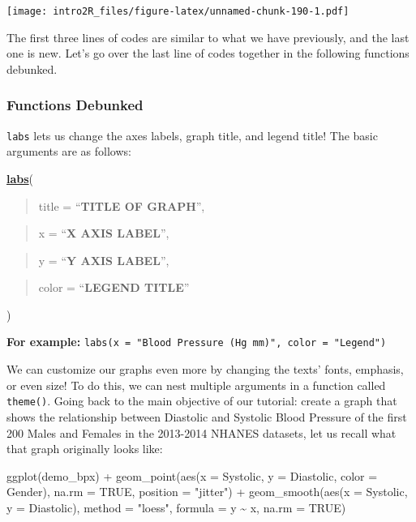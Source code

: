 \documentclass[
]{book}
\newenvironment{Shaded}{\begin{snugshade}}{\end{snugshade}}
\newcommand{\AttributeTok}[1]{\textcolor[rgb]{0.77,0.63,0.00}{#1}}
\newcommand{\ConstantTok}[1]{\textcolor[rgb]{0.00,0.00,0.00}{#1}}
\newcommand{\FunctionTok}[1]{\textcolor[rgb]{0.00,0.00,0.00}{#1}}
\newcommand{\NormalTok}[1]{#1}
\newcommand{\SpecialCharTok}[1]{\textcolor[rgb]{0.00,0.00,0.00}{#1}}
\newcommand{\StringTok}[1]{\textcolor[rgb]{0.31,0.60,0.02}{#1}}
\begin{document}
\texttt{[image: intro2R\_files/figure-latex/unnamed-chunk-190-1.pdf]}

The first three lines of codes are similar to what we have previously, and the last one is new. Let's go over the last line of codes together in the following functions debunked.

\hypertarget{functions-debunked-19}{%
\subsubsection{Functions Debunked}\label{functions-debunked-19}}

\texttt{labs} lets us change the axes labels, graph title, and legend title! The basic arguments are as follows:

\textbf{\href{https://ggplot2.tidyverse.org/reference/labs.html}{labs}}(

\begin{quote}
title = ``\textbf{TITLE OF GRAPH}'',
\end{quote}

\begin{quote}
x = ``\textbf{X AXIS LABEL}'',
\end{quote}

\begin{quote}
y = ``\textbf{Y AXIS LABEL}'',
\end{quote}

\begin{quote}
color = ``\textbf{LEGEND TITLE}''
\end{quote}

)

\textbf{For example:} \texttt{labs(x\ =\ "Blood\ Pressure\ (Hg\ mm)",\ color\ =\ "Legend")}

We can customize our graphs even more by changing the texts' fonts, emphasis, or even size! To do this, we can nest multiple arguments in a function called \texttt{theme()}. Going back to the main objective of our tutorial: create a graph that shows the relationship between Diastolic and Systolic Blood Pressure of the first 200 Males and Females in the 2013-2014 NHANES datasets, let us recall what that graph originally looks like:

\begin{Shaded}
\begin{Highlighting}[]
\FunctionTok{ggplot}\NormalTok{(demo\_bpx) }\SpecialCharTok{+}
    \FunctionTok{geom\_point}\NormalTok{(}\FunctionTok{aes}\NormalTok{(}\AttributeTok{x =}\NormalTok{ Systolic, }\AttributeTok{y =}\NormalTok{ Diastolic, }\AttributeTok{color =}\NormalTok{ Gender), }
             \AttributeTok{na.rm =} \ConstantTok{TRUE}\NormalTok{,}
             \AttributeTok{position =} \StringTok{"jitter"}\NormalTok{) }\SpecialCharTok{+}
    \FunctionTok{geom\_smooth}\NormalTok{(}\FunctionTok{aes}\NormalTok{(}\AttributeTok{x =}\NormalTok{ Systolic, }\AttributeTok{y =}\NormalTok{ Diastolic),}
                \AttributeTok{method =} \StringTok{"loess"}\NormalTok{,}
                \AttributeTok{formula =}\NormalTok{ y }\SpecialCharTok{\textasciitilde{}}\NormalTok{ x,}
                \AttributeTok{na.rm =} \ConstantTok{TRUE}\NormalTok{)}
\end{Highlighting}
\end{Shaded}
\end{document}
